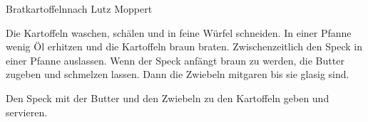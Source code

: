 \begin{recipe}{Bratkartoffeln}{nach Lutz Moppert}
  \inglist

  \steps
  Die Kartoffeln waschen, schälen und in feine Würfel schneiden. In einer Pfanne wenig Öl
  erhitzen und die Kartoffeln braun braten. Zwischenzeitlich den Speck in einer Pfanne
  auslassen. Wenn der Speck anfängt braun zu werden, die Butter zugeben und schmelzen
  lassen. Dann die Zwiebeln mitgaren bis sie glasig sind.

  Den Speck mit der Butter und den Zwiebeln zu den Kartoffeln geben und servieren.
\end{recipe}
